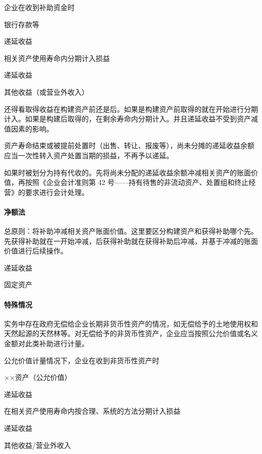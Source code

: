 \documentclass[UTF8,12pt]{ctexart}
\newenvironment{Dr}{%
	\begin{list}{}%
		{
			\setlength{\leftmargin}{2em}
			\setlength{\labelwidth}{2em}
			\setlength{\labelsep}{0pt}
			\setlength{\itemindent}{0pt}
			\setlength{\listparindent}{0pt}
			\setlength{\parsep}{0pt}
			\setlength{\topsep}{0pt}
		}
		\item[\textbf{借：}]
	}{%
	\end{list}
}
\newenvironment{Cr}{%
	\begin{list}{}%
		{
			\setlength{\leftmargin}{3em}
			\setlength{\labelwidth}{2em}
			\setlength{\labelsep}{0pt}
			\setlength{\itemindent}{0pt}
			\setlength{\listparindent}{0pt}
			\setlength{\parsep}{0pt}
			\setlength{\topsep}{0pt}
		}
		\item[\textbf{贷：}]
	}{%
	\end{list}
}
\numberwithin{equation}{section} %
\numberwithin{figure}{section}
\numberwithin{table}{section}
\begin{document}
	企业在收到补助资金时
	\begin{Dr}
		银行存款等
	\end{Dr}
	\begin{Cr}
		递延收益
	\end{Cr}

	相关资产使用寿命内分期计入损益
	\begin{Dr}
		递延收益
	\end{Dr}
	\begin{Cr}
		其他收益（或营业外收入）
	\end{Cr}
	
	还得看取得收益在构建资产前还是后。如果是构建资产前取得的就在开始进行分期计入。如果是构建后取得的，在剩余寿命内分期计入。并且递延收益不受到资产减值因素的影响。
	
	资产寿命结束或被提前处置时（出售、转让、报废等），尚未分摊的递延收益余额应当一次性转入资产处置当期的损益，不再予以递延。
	
	如果时被划分为持有代收的。先将尚未分配的递延收益余额冲减相关资产的账面价值，再按照《企业会计准则第 42 号——持有待售的非流动资产、处置组和终止经营》的要求进行会计处理。
	
	
	\paragraph{净额法}
	总原则：将补助冲减相关资产账面价值。这里要区分构建资产和获得补助哪个先。先获得补助就在一开始冲减，后获得补助就在获得补助后冲减，并基于冲减的账面价值进行后续操作。
	
	\begin{Dr}
		递延收益
	\end{Dr}
	\begin{Cr}
		固定资产
	\end{Cr}
	
	
	\paragraph{特殊情况}
	实务中存在政府无偿给企业长期非货币性资产的情况，如无偿给予的土地使用权和天然起源的天然林等。对无偿给予的非货币性资产，企业应当按照公允价值或名义金额对此类补助进行计量。
	
	公允价值计量情况下，企业在收到非货币性资产时
	\begin{Dr}
		××资产（公允价值）
	\end{Dr}
	\begin{Cr}
		递延收益
	\end{Cr}
	
	在相关资产使用寿命内按合理、系统的方法分期计入损益
	\begin{Dr}
		递延收益
	\end{Dr}
	\begin{Cr}
		其他收益/营业外收入
	\end{Cr}
\end{document}

